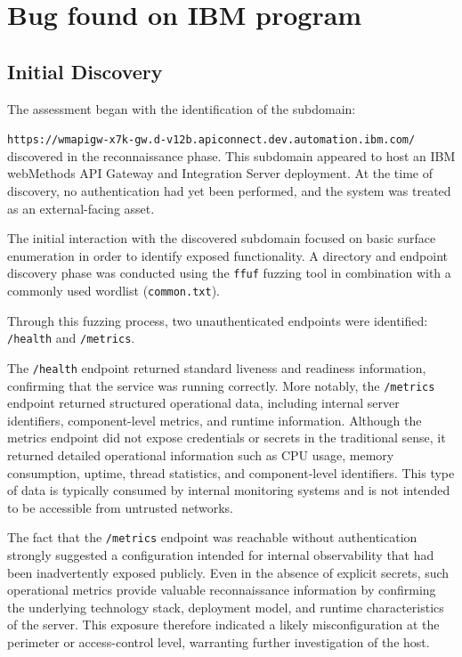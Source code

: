 \documentclass[12pt,a4paper]{report}
\begin{document}
\chapter{Bug found on IBM program}

\section{Initial Discovery }

The assessment began with the identification of the subdomain:

\texttt{https://wmapigw-x7k-gw.d-v12b.apiconnect.dev.automation.ibm.com/} discovered in the reconnaissance phase. This subdomain appeared to host an IBM webMethods API Gateway and Integration Server deployment. At the time of discovery, no authentication had yet been performed, and the system was treated as an external-facing asset.

The initial interaction with the discovered subdomain focused on basic surface enumeration in order to identify exposed functionality. A directory and endpoint discovery phase was conducted using the \texttt{ffuf} fuzzing tool in combination with a commonly used wordlist (\texttt{common.txt}).

Through this fuzzing process, two unauthenticated endpoints were identified: \texttt{/health} and \texttt{/metrics}.

The \texttt{/health} endpoint returned standard liveness and readiness information, confirming that the service was running correctly. More notably, the \texttt{/metrics} endpoint returned structured operational data, including internal server identifiers, component-level metrics, and runtime information. Although the metrics endpoint did not expose credentials or secrets in the traditional sense, it returned detailed operational information such as CPU usage, memory consumption, uptime, thread statistics, and component-level identifiers. This type of data is typically consumed by internal monitoring systems  and is not intended to be accessible from untrusted networks.

The fact that the \texttt{/metrics} endpoint was reachable without authentication strongly suggested a configuration intended for internal observability that had been inadvertently exposed publicly. Even in the absence of explicit secrets, such operational metrics provide valuable reconnaissance information by confirming the underlying technology stack, deployment model, and runtime characteristics of the server. This exposure therefore indicated a likely misconfiguration at the perimeter or access-control level, warranting further investigation of the host.
\end{document}
